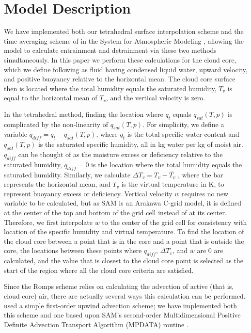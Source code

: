 \documentclass[12pt]{article}
\begin{document}

\section{Model Description}

We have implemented both our tetrahedral surface interpolation scheme and the 
time averaging scheme of \cite{Romps2010} in the System for Atmospheric 
Modeling \citep[SAM;][]{Khairoutdinov2003}, allowing the model to calculate 
entrainment and detrainment via these two methods simultaneously.  In this 
paper we perform these calculations for the cloud core, which we define 
following \cite{Siebesma1995} as fluid having condensed liquid water, upward 
velocity, and positive buoyancy relative to the horizontal mean.  The cloud 
core surface then is located where the total humidity equals the saturated 
humidity, $T_v$ is equal to the horizontal mean of $T_v$, and the vertical 
velocity is zero.

In the tetrahedral method, finding the location where $q_t$ equals 
$q_{sat}(T, p)$ is complicated by the non-linearity of $q_{sat}(T, p)$.  For 
simplicity, we define a variable $q_{diff} = q_t - q_{sat}(T, p)$, where $q_t$ 
is the total specific water content and $q_{sat} (T, p)$ is the saturated 
specific humidity, all in kg water per kg of moist air.  $q_{diff}$ can be 
thought of as the moisture excess or deficiency relative to the saturated 
humidity, $q_{diff} = 0$ is the location where the total humidity equals the 
saturated humidity.  Similarly, we calculate 
$\Delta T_v = T_v - \overline{T_v}$ , where the bar represents the horizontal 
mean, and $T_v$ is the virtual temperature in K, to represent buoyancy excess 
or deficiency.  Vertical velocity $w$ requires no new variable to be calculated, 
but as SAM is an Arakawa C-grid model, it is defined at the center of the top 
and bottom of the grid cell instead of at its center.  Therefore, we first 
interpolate $w$ to the center of the grid cell for consistency with location of 
the specific humidity and virtual temperature.  To find the location of the 
cloud core between a point that is in the core and a point that is outside the 
core, the locations between these points where $q_{diff}$, $\Delta T_v$, and 
$w$ are 0 are calculated, and the value that is closest to the cloud core point 
is selected as the start of the region where all the cloud core criteria are 
satisfied. 

Since the Romps scheme relies on calculating the advection of active (that is, 
cloud core) air, there are actually several ways this calculation can be 
performed.  \cite{Romps2010} used a simple first-order upwind advection scheme; 
we have implemented both this scheme and one based upon SAM's second-order 
Multidimensional Positive Definite Advection Transport Algorithm (MPDATA) 
routine \citep{Smolarkiewicz1990}.
\end{document}
